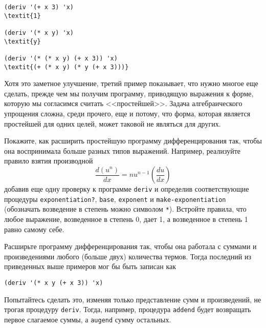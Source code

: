 \begin{Verbatim}[fontsize=\small]
(deriv '(+ x 3) 'x)
\textit{1}

(deriv '(* x y) 'x)
\textit{y}

(deriv '(* (* x y) (+ x 3)) 'x)
\textit{(+ (* x y) (* y (+ x 3)))}
\end{Verbatim}
Хотя это заметное улучшение, третий пример показывает, что нужно
многое еще сделать, прежде чем мы получим программу, приводящую
выражения к форме, которую мы согласимся считать <<простейшей>>.
Задача алгебраического упрощения сложна, среди прочего, еще и потому,
что форма, которая является простейшей для одних целей, может таковой
не являться для других.
\begin{exercise}{2.56}\label{EX2.56}%
%
Покажите, как расширить простейшую программу
дифференцирования так, чтобы она воспринимала больше разных типов 
выражений.  Например, реализуйте правило взятия производной
$$
  \frac{d(u^n)}{dx} = n u^{n-1} (\frac{du}{dx})
$$
добавив еще одну проверку к программе {\tt deriv} и определив
соответствующие процедуры {\tt exponentiation?},
{\tt base}, {\tt exponent} и
{\tt make-exponentiation} (обозначать возведение в степень
можно символом {\tt **}).  Встройте правила, что любое выражение,
возведенное в степень 0, дает 1, а возведенное в степень 1 равно
самому себе.
\end{exercise}
\begin{exercise}{2.57}\label{EX2.57}%
Расширьте программу дифференцирования так, чтобы она
работала с суммами и произведениями любого (больше двух) количества
термов.  Тогда последний из приведенных выше примеров мог бы быть записан 
как

\begin{Verbatim}[fontsize=\small]
(deriv '(* x y (+ x 3)) 'x)
\end{Verbatim}
Попытайтесь сделать это, изменяя только представление сумм и
произведений, не трогая процедуру {\tt deriv}.  Тогда,
например, процедура {\tt addend} будет возвращать первое
слагаемое суммы, а {\tt augend} сумму остальных.
\end{exercise}
